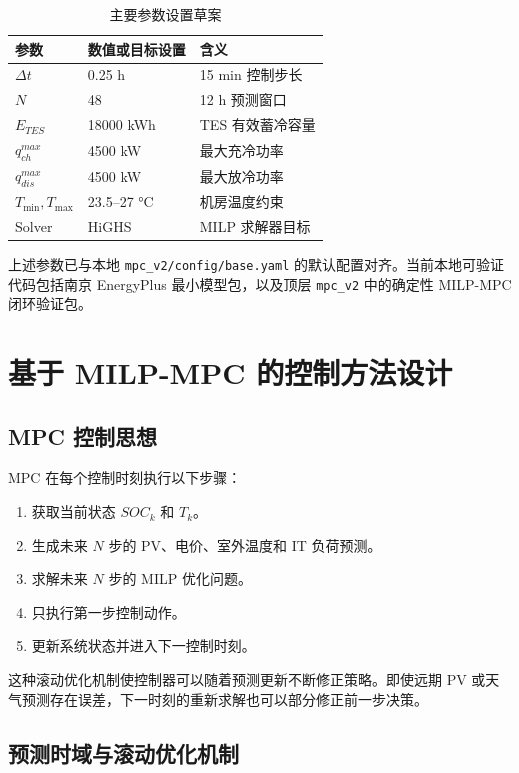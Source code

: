\documentclass[UTF8,a4paper,12pt]{ctexrep}
\begin{document}
\begin{table}[htbp]
  \centering
  \caption{主要参数设置草案}
  \begin{tabular}{lll}
    \toprule
    参数 & 数值或目标设置 & 含义 \\
    \midrule
    $\Delta t$ & 0.25 h & 15 min 控制步长 \\
    $N$ & 48 & 12 h 预测窗口 \\
    $E_{TES}$ & 18000 kWh & TES 有效蓄冷容量 \\
    $q_{ch}^{max}$ & 4500 kW & 最大充冷功率 \\
    $q_{dis}^{max}$ & 4500 kW & 最大放冷功率 \\
    $T_{\min},T_{\max}$ & 23.5--27 \si{\degreeCelsius} & 机房温度约束 \\
    Solver & HiGHS & MILP 求解器目标 \\
    \bottomrule
  \end{tabular}
\end{table}

上述参数已与本地 \texttt{mpc\_v2/config/base.yaml} 的默认配置对齐。当前本地可验证代码包括南京 EnergyPlus 最小模型包，以及顶层 \texttt{mpc\_v2} 中的确定性 MILP-MPC 闭环验证包。

\chapter{基于 MILP-MPC 的控制方法设计}

\section{MPC 控制思想}

MPC 在每个控制时刻执行以下步骤：

\begin{enumerate}[label=(\arabic*)]
  \item 获取当前状态 $SOC_k$ 和 $T_k$。
  \item 生成未来 $N$ 步的 PV、电价、室外温度和 IT 负荷预测。
  \item 求解未来 $N$ 步的 MILP 优化问题。
  \item 只执行第一步控制动作。
  \item 更新系统状态并进入下一控制时刻。
\end{enumerate}

这种滚动优化机制使控制器可以随着预测更新不断修正策略。即使远期 PV 或天气预测存在误差，下一时刻的重新求解也可以部分修正前一步决策。

\section{预测时域与滚动优化机制}
\end{document}
